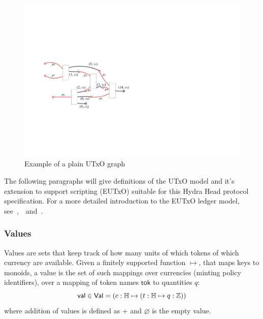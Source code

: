 \begin{figure}[h]
  \centering
 \includegraphics[width=\textwidth/2]{figures/utxo-graph.pdf}
 \caption{Example of a plain UTxO graph}\label{fig:utxo-graph}
\end{figure}

The following paragraphs will give definitions of the UTxO model and it's
extension to support scripting (EUTxO) suitable for this Hydra Head protocol
specification. For a more detailed introduction to the EUTxO ledger model,
see~\cite{eutxo},~\cite{eutxo-2}~and~\cite{utxo-ma}.

\subsubsection{Values}

\begin{definition}[Values]
  Values are sets that keep track of how many units of which tokens of which
  currency are available. Given a finitely supported function $\mapsto$, that
  maps keys to monoids, a value is the set of such mappings over currencies
  (minting policy identifiers), over a mapping of token names $\mathsf{tok}$ to
  quantities $q$:
  \[
    \mathsf{val} \in \mathsf{Val} = (c : \mathbb{H} \mapsto (t : \mathbb{H} \mapsto q : \mathbb{Z}))
  \]
  \noindent where addition of values is defined as $+$ and $\varnothing$ is the empty value.
\end{definition}


